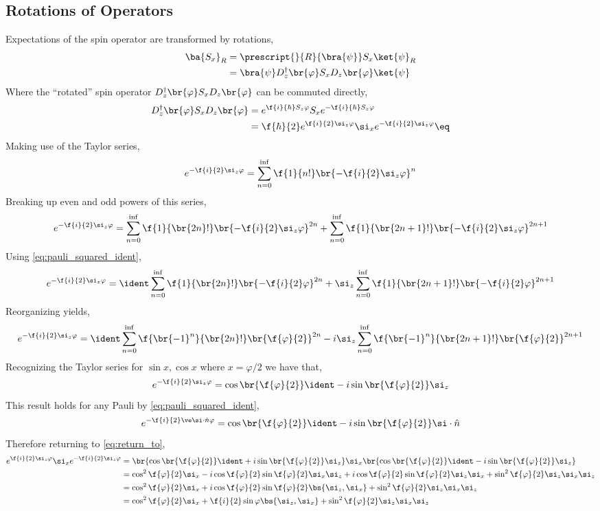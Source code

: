\documentclass{article}
\begin{document}
\subsection{Rotations of Operators}
Expectations of the spin operator are transformed by rotations,
\begin{align*}
    \ba{S_x}_R &= \prescript{}{R}{\bra{\psi}} S_x \ket{\psi}_R \\
    &= \bra{\psi} D^{\dagger}_z\br{\varphi} S_x D_z\br{\varphi} \ket{\psi}
\end{align*}
Where the ``rotated'' spin operator $D^{\dagger}_z\br{\varphi} S_x D_z\br{\varphi}$ can be commuted directly,
\begin{align*}
    D^{\dagger}_z\br{\varphi} S_x D_z\br{\varphi} &= e^{\f{i}{\hbar} S_z \varphi } S_x e^{-\f{i}{\hbar} S_z \varphi } \\
    &= \f{\hbar}{2} e^{\f{i}{2} \si_z \varphi } \si_x e^{-\f{i}{2} \si_z \varphi } \eq \label{eq:return_to}
\end{align*}
Making use of the Taylor series,
\[ e^{-\f{i}{2} \si_z \varphi} = \sum_{n=0}^{\inf} \f{1}{n!}\br{-\f{i}{2} \si_z \varphi }^n \]
Breaking up even and odd powers of this series,
\[ e^{-\f{i}{2} \si_z \varphi} = \sum_{n=0}^{\inf} \f{1}{\br{2n}!}\br{-\f{i}{2} \si_z \varphi }^{2n} + \sum_{n=0}^{\inf} \f{1}{\br{2n + 1}!}\br{-\f{i}{2} \si_z \varphi }^{2n + 1} \]
Using \cref{eq:pauli_squared_ident},
\[ e^{-\f{i}{2} \si_z \varphi} = \ident \sum_{n=0}^{\inf} \f{1}{\br{2n}!}\br{-\f{i}{2} \varphi }^{2n} + \si_z\sum_{n=0}^{\inf} \f{1}{\br{2n + 1}!}\br{-\f{i}{2} \varphi }^{2n + 1} \]
Reorganizing yields,
\[ e^{-\f{i}{2} \si_z \varphi} = \ident \sum_{n=0}^{\inf} \f{\br{-1}^n}{\br{2n}!}\br{\f{\varphi}{2}  }^{2n} - i \si_z\sum_{n=0}^{\inf} \f{\br{-1}^n}{\br{2n + 1}!}\br{\f{\varphi}{2}}^{2n + 1} \]
Recognizing the Taylor series for $\sin x, \cos x$ where $x = \varphi / 2$ we have that,
\[ e^{-\f{i}{2} \si_z \varphi} =  \cos\br{\f{\varphi}{2}}\ident - i \sin\br{\f{\varphi}{2}} \si_z \]
This result holds for any Pauli by \cref{eq:pauli_squared_ident},
\[ e^{-\f{i}{2} \ve \si \cdot \hat n \varphi} =  \cos\br{\f{\varphi}{2}}\ident - i \sin\br{\f{\varphi}{2}} \si \cdot \hat n \]
Therefore returning to \cref{eq:return_to},
\begin{align*}
    e^{\f{i}{2} \si_z \varphi } \si_x e^{-\f{i}{2} \si_z \varphi } &=
    \br{\cos\br{\f{\varphi}{2}}\ident + i \sin\br{\f{\varphi}{2}} \si_z} \si_x \br{\cos\br{\f{\varphi}{2}}\ident - i \sin\br{\f{\varphi}{2}} \si_z} \\
    &= \cos^2 \f{\varphi}{2} \si_x - i \cos \f{\varphi}{2} \sin \f{\varphi}{2} \si_x \si_z + i \cos \f{\varphi}{2} \sin \f{\varphi}{2} \si_z \si_x + \sin^2 \f{\varphi}{2} \si_z \si_x \si_z \\
    &= \cos^2 \f{\varphi}{2} \si_x + i \cos \f{\varphi}{2} \sin \f{\varphi}{2} \bs{\si_z, \si_x}+ \sin^2 \f{\varphi}{2} \si_z \si_x \si_z \\
    &= \cos^2 \f{\varphi}{2} \si_x + \f{i}{2} \sin \varphi \bs{\si_z, \si_x}+ \sin^2 \f{\varphi}{2} \si_z \si_x \si_z
\end{align*}
\end{document}
